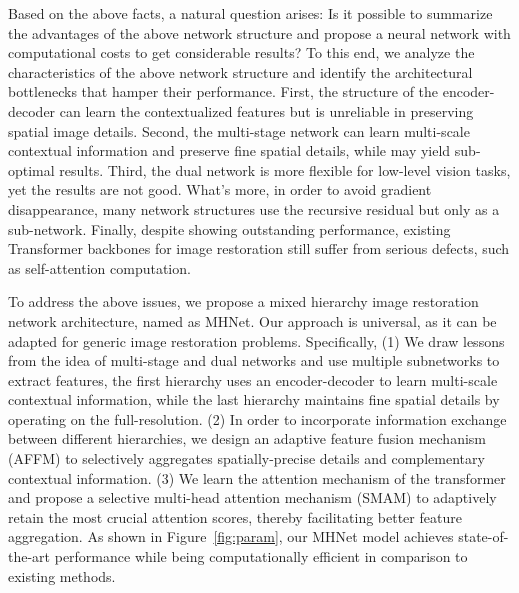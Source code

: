 \documentclass[lettersize,journal]{IEEEtran}
\begin{document}
Based on the above facts, a natural question arises: Is it possible to summarize the advantages of the above network structure and propose a neural network with computational costs to get considerable results? To this end, we analyze the characteristics of the above network structure and identify the architectural bottlenecks that hamper their performance. First, the structure of the encoder-decoder can learn the contextualized features but is unreliable in preserving spatial image details. Second, the multi-stage network can learn multi-scale contextual information and preserve fine spatial details, while may yield sub-optimal results. Third, the dual network is more flexible for low-level vision tasks, yet the results are not good. What's more, in order to avoid gradient disappearance, many network structures use the  recursive residual but only as a sub-network. Finally, despite showing outstanding performance, existing Transformer backbones for image restoration still suffer from serious defects, such as self-attention computation. 

To address the above issues, we propose a mixed hierarchy image restoration network architecture, named as MHNet. Our approach is universal, as it can be adapted for generic image restoration problems. Specifically, (1) We draw lessons from the idea of multi-stage and dual networks and use multiple subnetworks to extract features, the first hierarchy uses an encoder-decoder to learn multi-scale contextual information, while the last hierarchy maintains fine spatial details by operating on the full-resolution. 
(2) In order to incorporate information exchange between different hierarchies, we design an adaptive feature fusion mechanism (AFFM) to selectively aggregates spatially-precise details and complementary contextual information. 
(3) We learn the attention mechanism of the transformer and propose a selective multi-head attention mechanism (SMAM) to adaptively retain the most crucial attention scores, thereby facilitating better feature aggregation. As shown in Figure~\ref{fig:param}, our MHNet model achieves state-of-the-art performance while being computationally efficient in comparison to existing methods.
\end{document}
